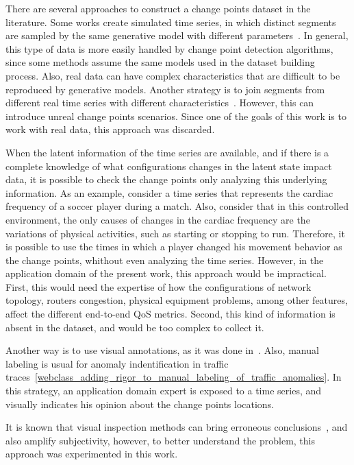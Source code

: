 There are several approaches to construct a
change points dataset in the literature.
Some works create simulated time series, in which distinct segments are sampled
by the same generative model with different
parameters~\cite{change_point_detection_in_time_series_data_by_relative_density_ratio_estimation}.
In general, this type of data is more easily handled by change point detection
algorithms, since some methods assume the same models used in the dataset
building process. Also, real data can have complex characteristics that are
difficult to be reproduced by generative models. Another strategy is to join
segments from different real time series with different
characteristics~\cite{inertial_hidden_markov_models_modeling_change_in_multivariate_time_series}.
However, this can introduce unreal change points scenarios. Since one of
the goals of this work is to work with real data, this approach was discarded.

When the latent information of the time series are available, and if there is a
complete knowledge of what configurations changes in the latent state impact
data, it is possible to check the change points only analyzing this underlying
information. As an example, consider a time series that represents the cardiac
frequency of a soccer player during a match. Also, consider that in this
controlled environment, the only causes of changes in the cardiac frequency are
the variations of physical activities, such as starting or stopping to run.
Therefore,
it is possible to use the times in which a player changed his movement behavior
as the change points, whithout even analyzing the time series. However, in the
application domain of the present work, this approach would be impractical.
First, this would need the expertise of how the configurations of network
topology, routers congestion, physical equipment problems, among other features,
affect the different end-to-end QoS metrics.
Second, this kind of information is absent in the dataset, and would be too
complex to collect it.

Another way is to use visual annotations,
as it was done
in~\cite{learning_sparse_penalties_for_change_point_detection_using_max_margin_interval_regression}.
Also, manual labeling is usual for
anomaly indentification in traffic
traces~\ref{webclass_adding_rigor_to_manual_labeling_of_traffic_anomalies}.
In this strategy, an application domain expert is exposed to a time series,
and visually indicates his opinion about the change points locations.

It is known that visual inspection methods can bring erroneous
conclusions~\cite{leveraging_cloud_data_to_mitigate_user_experience_from_breaking_bad},
and also amplify subjectivity, however, to better understand the problem, this
approach was experimented in this work.

